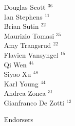 \documentclass[PICOReport.tex]{subfiles}
\begin{document}
{\begin{multicols}{4}
Douglas Scott $^{36}$                   \\
Ian Stephens $^{11}$                    \\
Brian Sutin $^{22}$                     \\
Maurizio Tomasi $^{35}$                 \\
Amy Trangsrud $^{22}$                   \\
Flavien Vansyngel $^{15}$               \\
Qi Wen $^{44}$                          \\
Siyao Xu $^{48}$                        \\
Karl Young $^{44}$                      \\
Andrea Zonca $^{31}$                    \\
Gianfranco De Zotti $^{13}$             
\end{multicols}
}

\Large { \centerline {Endorsers}}
\end{document}
